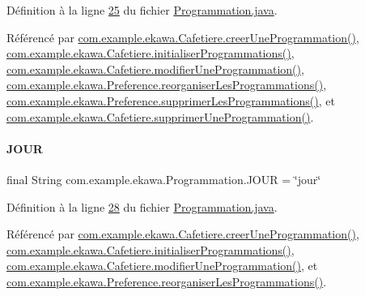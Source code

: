 Définition à la ligne \hyperlink{_programmation_8java_source_l00025}{25} du fichier \hyperlink{_programmation_8java_source}{Programmation.\+java}.



Référencé par \hyperlink{_cafetiere_8java_source_l00731}{com.\+example.\+ekawa.\+Cafetiere.\+creer\+Une\+Programmation()}, \hyperlink{_cafetiere_8java_source_l00692}{com.\+example.\+ekawa.\+Cafetiere.\+initialiser\+Programmations()}, \hyperlink{_cafetiere_8java_source_l00775}{com.\+example.\+ekawa.\+Cafetiere.\+modifier\+Une\+Programmation()}, \hyperlink{_preference_8java_source_l00157}{com.\+example.\+ekawa.\+Preference.\+reorganiser\+Les\+Programmations()}, \hyperlink{_preference_8java_source_l00142}{com.\+example.\+ekawa.\+Preference.\+supprimer\+Les\+Programmations()}, et \hyperlink{_cafetiere_8java_source_l00820}{com.\+example.\+ekawa.\+Cafetiere.\+supprimer\+Une\+Programmation()}.

\mbox{\label{classcom_1_1example_1_1ekawa_1_1_programmation_a6ec3fe1846e45e6c0794eebdffeaf54b}} 
\paragraph{\texorpdfstring{J\+O\+UR}{JOUR}}
{\footnotesize\ttfamily final String com.\+example.\+ekawa.\+Programmation.\+J\+O\+UR = \char`\"{}jour\char`\"{}\hspace{0.3cm}{\ttfamily [static]}}



Définition à la ligne \hyperlink{_programmation_8java_source_l00028}{28} du fichier \hyperlink{_programmation_8java_source}{Programmation.\+java}.



Référencé par \hyperlink{_cafetiere_8java_source_l00731}{com.\+example.\+ekawa.\+Cafetiere.\+creer\+Une\+Programmation()}, \hyperlink{_cafetiere_8java_source_l00692}{com.\+example.\+ekawa.\+Cafetiere.\+initialiser\+Programmations()}, \hyperlink{_cafetiere_8java_source_l00775}{com.\+example.\+ekawa.\+Cafetiere.\+modifier\+Une\+Programmation()}, et \hyperlink{_preference_8java_source_l00157}{com.\+example.\+ekawa.\+Preference.\+reorganiser\+Les\+Programmations()}.


